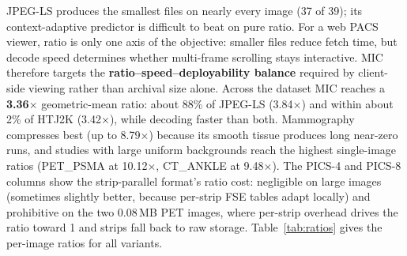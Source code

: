 \documentclass[journal]{IEEEtran}
\begin{document}
JPEG-LS produces the smallest files on nearly every image (37 of 39); its
context-adaptive predictor is difficult to beat on pure ratio. For a web PACS
viewer, ratio is only one axis of the objective: smaller files reduce fetch
time, but decode speed determines whether multi-frame scrolling stays
interactive. MIC therefore targets the
\textbf{ratio--speed--deployability balance} required by client-side viewing
rather than archival size alone. Across the dataset MIC reaches a
\textbf{3.36}$\times$ geometric-mean ratio: about 88\% of JPEG-LS
(3.84$\times$) and within about 2\% of HTJ2K (3.42$\times$), while decoding
faster than both. Mammography compresses best (up to 8.79$\times$) because
its smooth tissue produces long near-zero runs, and studies with large
uniform backgrounds reach the highest single-image ratios (PET\_PSMA at
10.12$\times$, CT\_ANKLE at 9.48$\times$). The PICS-4 and PICS-8 columns
show the strip-parallel format's ratio cost: negligible on large images
(sometimes slightly better, because per-strip FSE tables adapt locally) and
prohibitive on the two 0.08\,MB PET images, where per-strip overhead drives
the ratio toward 1 and strips fall back to raw storage.
Table~\ref{tab:ratios} gives the per-image ratios for all variants.
\end{document}
